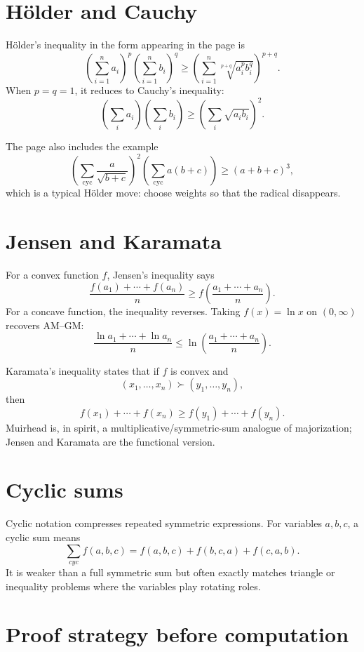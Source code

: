 \section{Hölder and Cauchy}

Hölder's inequality in the form appearing in the page is
\[
  \left(\sum_{i=1}^n a_i\right)^p
  \left(\sum_{i=1}^n b_i\right)^q
  \ge
  \left(\sum_{i=1}^n \sqrt[p+q]{a_i^p b_i^q}\right)^{p+q}.
\]
When \(p=q=1\), it reduces to Cauchy's inequality:
\[
  \left(\sum_i a_i\right)\left(\sum_i b_i\right)
  \ge
  \left(\sum_i\sqrt{a_i b_i}\right)^2.
\]

The page also includes the example
\[
  \left(\sum_{\mathrm{cyc}}\frac a{\sqrt{b+c}}\right)^2
  \left(\sum_{\mathrm{cyc}}a(b+c)\right)
  \ge
  (a+b+c)^3,
\]
which is a typical Hölder move: choose weights so that the radical disappears.

\section{Jensen and Karamata}

For a convex function \(f\), Jensen's inequality says
\[
  \frac{f(a_1)+\cdots+f(a_n)}{n}
  \ge
  f\left(\frac{a_1+\cdots+a_n}{n}\right).
\]
For a concave function, the inequality reverses.  Taking \(f(x)=\ln x\) on \((0,\infty)\) recovers AM--GM:
\[
  \frac{\ln a_1+\cdots+\ln a_n}{n}
  \le
  \ln\left(\frac{a_1+\cdots+a_n}{n}\right).
\]

Karamata's inequality states that if \(f\) is convex and
\[
  (x_1,\ldots,x_n)\succ(y_1,\ldots,y_n),
\]
then
\[
  f(x_1)+\cdots+f(x_n)
  \ge
  f(y_1)+\cdots+f(y_n).
\]
Muirhead is, in spirit, a multiplicative/symmetric-sum analogue of majorization; Jensen and Karamata are the functional version.


\section{Cyclic sums}

Cyclic notation compresses repeated symmetric expressions.  For variables \(a,b,c\), a cyclic sum means
\[
  \sum_{cyc} f(a,b,c)=f(a,b,c)+f(b,c,a)+f(c,a,b).
\]
It is weaker than a full symmetric sum but often exactly matches triangle or inequality problems where the variables play rotating roles.

\section{Proof strategy before computation}

